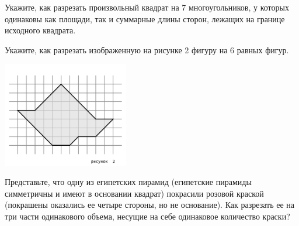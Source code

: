 ﻿
\begin{enumerate}
\itA Укажите, как разрезать произвольный квадрат на 7 многоугольников, у которых одинаковы как площади, так и суммарные длины сторон, лежащих на границе исходного квадрата.

\itB Укажите, как разрезать изображенную на рисунке 2 фигуру на 6 равных фигур.

\centerline{\includegraphics[width=5.5cm]{stats/2018/images/figure-cuts}}

\itC Представьте, что одну из египетских пирамид (египетские пирамиды симметричны и имеют в основании квадрат) покрасили розовой краской (покрашены оказались ее четыре стороны, но не основание). Как разрезать ее на три части одинакового объема, несущие на себе одинаковое количество краски?
\end{enumerate}